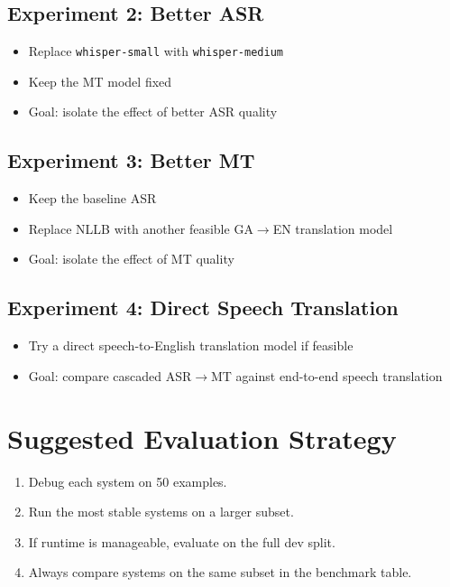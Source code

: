\documentclass[11pt,a4paper]{article}
\begin{document}
\subsection{Experiment 2: Better ASR}

\begin{itemize}[leftmargin=1.4em]
  \item Replace \texttt{whisper-small} with \texttt{whisper-medium}
  \item Keep the MT model fixed
  \item Goal: isolate the effect of better ASR quality
\end{itemize}

\subsection{Experiment 3: Better MT}

\begin{itemize}[leftmargin=1.4em]
  \item Keep the baseline ASR
  \item Replace NLLB with another feasible GA$\rightarrow$EN translation model
  \item Goal: isolate the effect of MT quality
\end{itemize}

\subsection{Experiment 4: Direct Speech Translation}

\begin{itemize}[leftmargin=1.4em]
  \item Try a direct speech-to-English translation model if feasible
  \item Goal: compare cascaded ASR$\rightarrow$MT against end-to-end speech translation
\end{itemize}

\section{Suggested Evaluation Strategy}

\begin{enumerate}[leftmargin=1.6em]
  \item Debug each system on 50 examples.
  \item Run the most stable systems on a larger subset.
  \item If runtime is manageable, evaluate on the full dev split.
  \item Always compare systems on the same subset in the benchmark table.
\end{enumerate}
\end{document}
